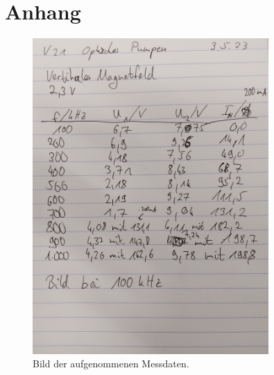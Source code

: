 \section{Anhang}
\label{sec:Anhang}

\begin{figure} [H]
    \centering
    \includegraphics[height=12cm]{content/messdaten.jpg}
    \caption{Bild der aufgenommenen Messdaten.}
    \label{fig:messdaten}
  \end{figure}
  